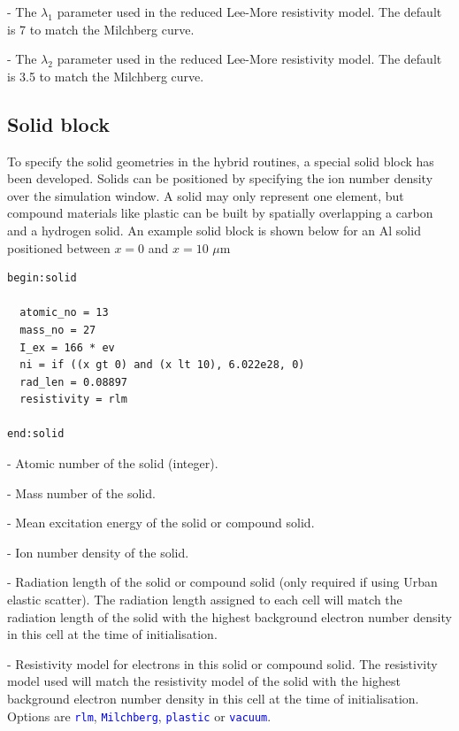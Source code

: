 \documentclass[12pt]{article}
\numberwithin{equation}{section}
\begin{document}
\bigskip {\large\textcolor{blue}{rlm\_1}} - The $\lambda_1$ parameter used in the reduced Lee-More resistivity model. The default is 7 to match the Milchberg curve.

\bigskip {\large\textcolor{blue}{rlm\_2}} - The $\lambda_2$ parameter used in the reduced Lee-More resistivity model. The default is 3.5 to match the Milchberg curve.

\subsection{Solid block} \label{sec:user:solid}

To specify the solid geometries in the hybrid routines, a special solid block has been developed. Solids can be positioned by specifying the ion number density over the simulation window. A solid may only represent one element, but compound materials like plastic can be built by spatially overlapping a carbon and a hydrogen solid. An example solid block is shown below for an Al solid positioned between $x=0$ and $x=10$ $\mu$m

\begin{lstlisting}[style=myInputDeck]
begin:solid

  atomic_no = 13
  mass_no = 27
  I_ex = 166 * ev
  ni = if ((x gt 0) and (x lt 10), 6.022e28, 0)
  rad_len = 0.08897
  resistivity = rlm

end:solid
\end{lstlisting}

\bigskip {\large\textcolor{blue}{atomic\_no}} - Atomic number of the solid (integer).

\bigskip {\large\textcolor{blue}{mass\_no}} - Mass number of the solid.

\bigskip {\large\textcolor{blue}{I\_ex}} - Mean excitation energy of the solid or compound solid.

\bigskip {\large\textcolor{blue}{ni}} - Ion number density of the solid.

\bigskip {\large\textcolor{blue}{rad\_len}} - Radiation length of the solid or compound solid (only required if using Urban elastic scatter). The radiation length assigned to each cell will match the radiation length of the solid with the highest background electron number density in this cell at the time of initialisation.

\bigskip {\large\textcolor{blue}{resistivity}} - Resistivity model for electrons in this solid or compound solid. The resistivity model used will match the resistivity model of the solid with the highest background electron number density in this cell at the time of initialisation. Options are \textcolor{blue}{\texttt{rlm}}, \textcolor{blue}{\texttt{Milchberg}}, \textcolor{blue}{\texttt{plastic}} or \textcolor{blue}{\texttt{vacuum}}. 
\end{document}
